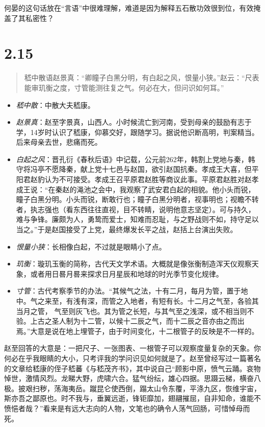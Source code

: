 \documentclass[]{book}
\providecommand{\tightlist}{%
  \setlength{\itemsep}{0pt}\setlength{\parskip}{0pt}}
\begin{document}
何晏的这句话放在``言语''中很难理解，难道是因为解释五石散功效很到位，有效掩盖了其私密性？

\section{2.15}\label{section-61}

\begin{quote}
嵇中散语赵景真：``卿瞳子白黑分明，有白起之风，恨量小狭。''赵云：``尺表能审玑衡之度，寸管能测往复之气。何必在大，但问识如何耳。''
\end{quote}

\begin{itemize}
\tightlist
\item
  \emph{嵇中散}：中散大夫嵇康。
\item
  \emph{赵景真}：赵至字景真，山西人。小时候流亡到河南，受到母亲的鼓励有志于学，14岁时认识了嵇康，仰慕交好，跟随学习。据说他识断高明，判案精当。后来母亲去世，悲痛而死。
\item
  \emph{白起之风}：晋孔衍《春秋后语》中记载，公元前262年，韩割上党地与秦，韩守将冯亭不愿降秦，献上党十七邑与赵国，欲引赵国抗秦。孝成王大喜，但平阳君赵豹认为不可接受。孝成王召平原君赵胜等商议此事。平原君赵胜对赵孝成王说：``在秦赵的渑池之会中，我观察了武安君白起的相貌。他小头而锐，瞳子白黑分明。小头而锐，断敢行也；瞳子白黑分明者，视事明也；视瞻不转者，执志强也（看东西往往直视，目不转睛，说明他意志坚定）。可与持久，难与争锋。廉颇为人，勇鸷而爱士，知难而忍耻，与之野战则不如，持守足以当之。''于是赵国接受了上党，最终爆发长平之战，赵括上台演出失败。
\item
  \emph{恨量小狭}：长相像白起，不过就是眼睛小了点。
\item
  \emph{玑衡}：璇玑玉衡的简称，古代天文学术语。大概就是像张衡制造浑天仪观察天象，或者用日晷月晷来探求日月星辰和地球的时光季节变化规律。
\item
  \emph{寸管}：古代考察季节的办法。``其候气之法，十有二月，每月为管，置于地中。气之来至，有浅有深，而管之入地者，有短有长。十二月之气至，各验其当月之管，
  气至则灰飞也。其为管之长短，与其气至之浅深，或不相当则不验。上古之圣人制为十二管，以候十二辰之气，而十二辰之音亦由之而出焉。''大意是说在地上埋管子，由于时间变化，十二根管子的反映是不一样的。
\end{itemize}

赵至回答的大意是：一把尺子、一张图表、一根管子可以观察度量复杂的天象。你何必在乎我眼睛的大小，只考评我的学问识见如何就是了。赵至曾经写过一篇著名的文章给嵇康的侄子嵇蕃《与嵇茂齐书》，其中说自己``顾影中原，愤气云踊。哀物悼世，激情风烈。龙睇大野，虎啸六合。猛气纷纭，雄心四据。思蹑云梯，横奋八极。披艰扫秽，荡海夷岳。蹴昆仑使西倒，蹋太山令东覆，平涤九区，恢维宇宙，斯亦吾之鄙原也。时不我与，垂翼远逝，锋钜靡加，翅翮摧屈，自非知命，谁能不愤悒者哉？''看来是有远大志向的人物，文笔也的确令人荡气回肠，可惜悼母而死。
\end{document}
